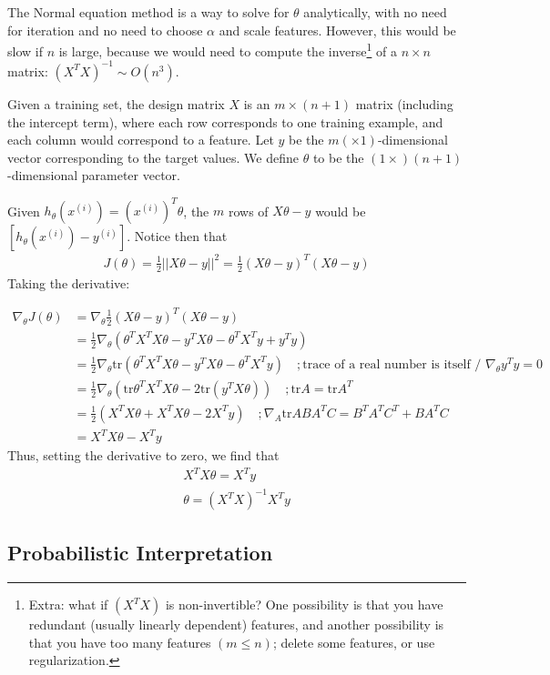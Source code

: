 \documentclass[letterpaper,10pt]{article}
\begin{document}
The Normal equation method is a way to solve for $\theta$ analytically, with no need for iteration and no need to choose $\alpha$ and scale features. However, this would be slow if $n$ is large, because we would need to compute the inverse\footnote{Extra: what if $\left( X^T X \right)$ is non-invertible? One possibility is that you have redundant (usually linearly dependent) features, and another possibility is that you have too many features $(m \leq n)$; delete some features, or use regularization.} of a $n\times n$ matrix: $\left( X^T X \right)^{-1} \sim O(n^3)$.

Given a training set, the design matrix $X$ is an $m \times (n+1)$ matrix (including the intercept term), where each row corresponds to one training example, and each column would correspond to a feature. Let $y$ be the $m (\times 1)$-dimensional vector corresponding to the target values. We define $\theta$ to be the $(1 \times) (n+1)$-dimensional parameter vector.

Given $h_\theta(x^{(i)}) = (x^{(i)})^T \theta$, the $m$ rows of $X \theta - y$ would be $[h_\theta(x^{(i)}) - y^{(i)}]$. Notice then that 
\begin{align}
J(\theta) = \frac{1}{2} || X\theta - y ||^2 = \frac{1}{2} (X\theta - y)^T (X\theta - y)
\end{align}
Taking the derivative:

\begin{align}
\nabla_\theta J(\theta) &= \nabla_\theta \frac{1}{2} (X\theta - y)^T (X\theta - y) \\
&=\frac{1}{2} \nabla_\theta  (\theta^TX^TX\theta - y^TX\theta  - \theta^TX^Ty + y^Ty ) \\
&=\frac{1}{2} \nabla_\theta  \text{tr}( \theta^TX^TX\theta - y^TX\theta  - \theta^TX^Ty) \quad ; \text{trace of a real number is itself / $\nabla_\theta y^Ty = 0$}\\
&=\frac{1}{2} \nabla_\theta  (\text{tr} \theta^TX^TX\theta - 2\text{tr}(y^TX\theta)) \quad ; \text{tr}A=\text{tr}A^T \\
&=\frac{1}{2} (X^TX\theta + X^TX\theta - 2X^Ty) \quad ; \nabla_A \text{tr}ABA^TC = B^TA^TC^T + BA^TC \\
&= X^TX\theta - X^Ty
\end{align}
Thus, setting the derivative to zero, we find that
\begin{align}
X^TX\theta = X^Ty \\
\theta = (X^TX)^{-1}X^Ty
\end{align}

\subsection{Probabilistic Interpretation}
\end{document}
